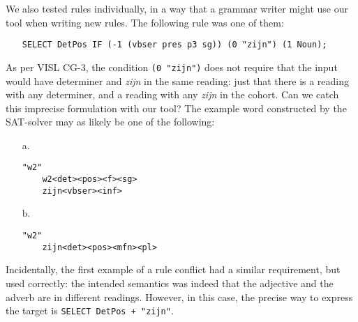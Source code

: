 

We also tested rules individually, in a way that a grammar writer might use our tool when writing new rules.
The following rule was one of them:

\begin{itemize}
\item[] 
\texttt{SELECT DetPos IF (-1 (vbser pres p3 sg)) (0 "zijn") (1 Noun);}
\end{itemize} 

As per VISL CG-3, the condition \texttt{(0 "zijn")} does not require
that the input would have determiner and \emph{zijn} in the same reading:
just that there is a reading with any determiner, and a reading with any \emph{zijn} in the cohort. 
Can we catch this imprecise formulation with our tool? The example word constructed by the SAT-solver may as likely be one of the following:

\begin{itemize}
\item[a.] \begin{verbatim}
"w2"
    w2<det><pos><f><sg>
    zijn<vbser><inf>
\end{verbatim}

\item[b.] \begin{verbatim}
"w2"
    zijn<det><pos><mfn><pl>
\end{verbatim}
\end{itemize}

Incidentally, the first example of a rule conflict had a similar
requirement, but used correctly: the intended semantics was indeed
that the adjective and the adverb are in different readings. However,
in this case, the precise way to express the target is \texttt{SELECT DetPos + "zijn"}.

